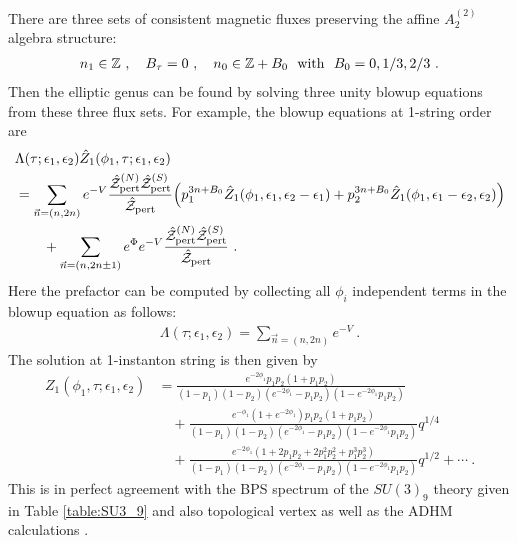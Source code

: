 There are three sets of consistent magnetic fluxes preserving the affine $A^{(2)}_2$ algebra structure:
\begin{align}
	n_1 \in \mathbb{Z}\ , \quad B_\tau = 0  \ , \quad n_0 \in \mathbb{Z}+B_0 \ \ {\rm with } \ \  B_0=0,1/3,2/3 \ .
\end{align}
Then the elliptic genus can be found by solving three unity blowup equations from these three flux sets. For example, the blowup equations at 1-string order are
\begin{align}
&\Lambda(\tau; \epsilon_1, \epsilon_2) \hat{Z}_1(\phi_1, \tau; \epsilon_1, \epsilon_2) \nonumber \\
&= \sum_{\vec{n} = (n, 2n)} e^{-V} \frac{\hat{\mathcal{Z}}_{\mathrm{pert}}^{(N)} \hat{\mathcal{Z}}_{\mathrm{pert}}^{(S)}}{\hat{\mathcal{Z}}_{\mathrm{pert}}} \qty(p_1^{3n + B_0} \hat{Z}_1(\phi_1, \epsilon_1, \epsilon_2 - \epsilon_1) + p_2^{3n + B_0} \hat{Z}_1(\phi_1, \epsilon_1 - \epsilon_2, \epsilon_2) ) \nonumber \\
& \qquad + \sum_{\vec{n} = (n, 2n \pm 1)} e^\Phi e^{-V} \frac{\hat{\mathcal{Z}}_{\mathrm{pert}}^{(N)} \hat{\mathcal{Z}}_{\mathrm{pert}}^{(S)}}{\hat{\mathcal{Z}}_{\mathrm{pert}}} \ .
\end{align}
Here the prefactor can be computed by collecting all $\phi_i$ independent terms in the blowup equation as follows:
\begin{align}
\Lambda(\tau; \epsilon_1, \epsilon_2) = \sum_{\vec{n} = (n, 2n)} e^{-V} \ .
\end{align}
The solution at 1-instanton string is then given by
\begin{align}
Z_1(\phi_1, \tau; \epsilon_1, \epsilon_2)
&= \frac{e^{-2\phi_1} p_1 p_2 (1+p_1 p_2)}{(1-p_1)(1-p_2) (e^{-2\phi_1} - p_1 p_2) (1-e^{-2\phi_1} p_1 p_2)} \nonumber \\
& \quad + \frac{e^{-\phi_1}(1+e^{-2\phi_1}) p_1 p_2 (1+p_1 p_2)}{(1-p_1) (1-p_2) (e^{-2\phi_1} - p_1 p_2) (1-e^{-2\phi_1} p_1 p_2)} q^{1/4} \nonumber \\
& \quad + \frac{e^{-2\phi_1} (1 + 2p_1 p_2 + 2p_1^2 p_2^2 + p_1^3 p_2^3)}{(1-p_1)(1-p_2) (e^{-2\phi_1} - p_1p_2)(1-e^{-2\phi_1} p_1 p_2)} q^{1/2} + \cdots \ .
\end{align}
This is in perfect agreement with the BPS spectrum of the $ SU(3)_9 $ theory given in Table \ref{table:SU3_9} and also topological vertex as well as the ADHM calculations \cite{Kim:2021cua}.